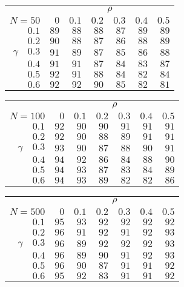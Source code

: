 \begin{tabular}{r|rrrrrr}
\hline\hline
 &\multicolumn{6}{c}{$\rho$} \\ 
 $N = 50$ & $0$ & $0.1$ & $0.2$ & $0.3$ & $0.4$ & $0.5$ \\ 
 \hline$0.1$ & $89$ & $88$ & $88$ & $87$ & $89$ & $89$\\ 
$0.2$ & $90$ & $88$ & $87$ & $86$ & $88$ & $89$\\ 
$\gamma\quad$$0.3$ & $91$ & $89$ & $87$ & $85$ & $86$ & $88$\\ 
$0.4$ & $91$ & $91$ & $87$ & $84$ & $83$ & $87$\\ 
$0.5$ & $92$ & $91$ & $88$ & $84$ & $82$ & $84$\\ 
$0.6$ & $92$ & $92$ & $90$ & $85$ & $82$ & $81$\\ 
 \hline 
 \end{tabular}
 
 \vspace{2em} 
 
\begin{tabular}{r|rrrrrr}
\hline\hline
 &\multicolumn{6}{c}{$\rho$} \\ 
 $N = 100$ & $0$ & $0.1$ & $0.2$ & $0.3$ & $0.4$ & $0.5$ \\ 
 \hline$0.1$ & $92$ & $90$ & $90$ & $91$ & $91$ & $91$\\ 
$0.2$ & $92$ & $90$ & $88$ & $89$ & $91$ & $91$\\ 
$\gamma\quad$$0.3$ & $93$ & $90$ & $87$ & $88$ & $90$ & $91$\\ 
$0.4$ & $94$ & $92$ & $86$ & $84$ & $88$ & $90$\\ 
$0.5$ & $94$ & $93$ & $87$ & $83$ & $84$ & $89$\\ 
$0.6$ & $94$ & $93$ & $89$ & $82$ & $82$ & $86$\\ 
 \hline 
 \end{tabular}
 
 \vspace{2em} 
 
\begin{tabular}{r|rrrrrr}
\hline\hline
 &\multicolumn{6}{c}{$\rho$} \\ 
 $N = 500$ & $0$ & $0.1$ & $0.2$ & $0.3$ & $0.4$ & $0.5$ \\ 
 \hline$0.1$ & $95$ & $93$ & $92$ & $92$ & $92$ & $92$\\ 
$0.2$ & $96$ & $91$ & $92$ & $91$ & $92$ & $93$\\ 
$\gamma\quad$$0.3$ & $96$ & $89$ & $92$ & $92$ & $92$ & $93$\\ 
$0.4$ & $96$ & $89$ & $90$ & $91$ & $92$ & $93$\\ 
$0.5$ & $96$ & $90$ & $87$ & $91$ & $91$ & $92$\\ 
$0.6$ & $95$ & $92$ & $83$ & $91$ & $91$ & $92$\\ 
 \hline 
 \end{tabular}